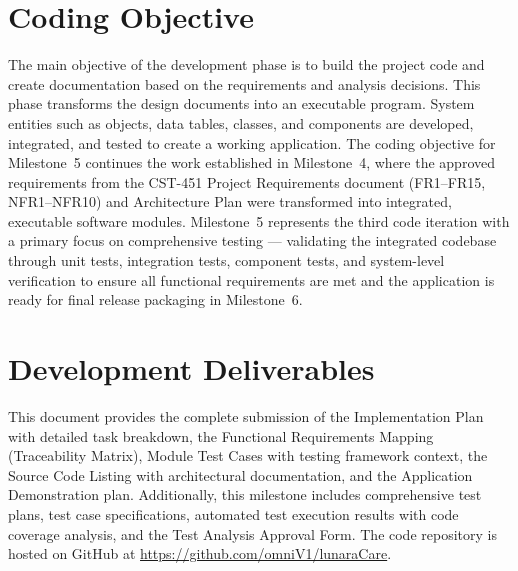 \documentclass[12pt,letterpaper]{article}
\begin{document}
\newpage

\thispagestyle{fancy}
\tableofcontents
\newpage

\section{Coding Objective}

The main objective of the development phase is to build the project code and create documentation based on the requirements and analysis decisions. This phase transforms the design documents into an executable program. System entities such as objects, data tables, classes, and components are developed, integrated, and tested to create a working application. The coding objective for Milestone~5 continues the work established in Milestone~4, where the approved requirements from the CST-451 Project Requirements document (FR1--FR15, NFR1--NFR10) and Architecture Plan were transformed into integrated, executable software modules. Milestone~5 represents the third code iteration with a primary focus on comprehensive testing --- validating the integrated codebase through unit tests, integration tests, component tests, and system-level verification to ensure all functional requirements are met and the application is ready for final release packaging in Milestone~6.

\section{Development Deliverables}

This document provides the complete submission of the Implementation Plan with detailed task breakdown, the Functional Requirements Mapping (Traceability Matrix), Module Test Cases with testing framework context, the Source Code Listing with architectural documentation, and the Application Demonstration plan. Additionally, this milestone includes comprehensive test plans, test case specifications, automated test execution results with code coverage analysis, and the Test Analysis Approval Form. The code repository is hosted on GitHub at \url{https://github.com/omniV1/lunaraCare}.

\newpage

\end{document}
